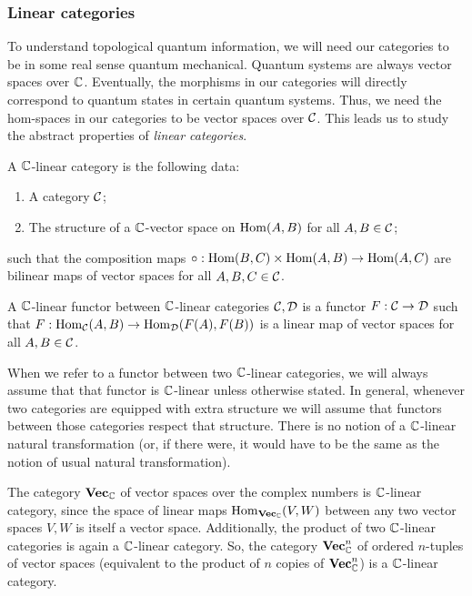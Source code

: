 \subsubsection{Linear categories}

To understand topological quantum information, we will need our categories to be in some real sense quantum mechanical. Quantum systems are always vector spaces over ${\mathbb C}$. Eventually, the morphisms in our categories will directly correspond to quantum states in certain quantum systems. Thus, we need the hom-spaces in our categories to be vector spaces over ${\mathcal C}$. This leads us to study the abstract properties of {\em linear categories}.

\begin{defn} A ${\mathbb C}$-linear category is the following data:

\begin{enumerate}
\item A category ${\mathcal C}$;
\item The structure of a ${\mathbb C}$-vector space on $\operatorname{Hom}(A,B)$ for all $A,B\in {\mathcal C}$;

\end{enumerate}

such that the composition maps $\circ:\operatorname{Hom}(B,C)\times \operatorname{Hom}(A,B)\to \operatorname{Hom}(A,C)$ are bilinear maps of vector spaces for all $A,B,C\in {\mathcal C}$.
\end{defn}

\begin{defn} A ${\mathbb C}$-linear functor between ${\mathbb C}$-linear categories ${\mathcal C},{\mathcal D}$ is a functor $F:{\mathcal C}\to{\mathcal D}$ such that $F:\operatorname{Hom}_{\mathcal C}(A,B)\to\operatorname{Hom}_{\mathcal D}(F(A),F(B))$ is a linear map of vector spaces for all $A,B\in{\mathcal C}$.
\end{defn}

\begin{rem} When we refer to a functor between two ${\mathbb C}$-linear categories, we will always assume that that functor is ${\mathbb C}$-linear unless otherwise stated. In general, whenever two categories are equipped with extra structure we will assume that functors between those categories respect that structure. There is no notion of a ${\mathbb C}$-linear natural transformation (or, if there were, it would have to be the same as the notion of usual natural transformation).
\end{rem}

\begin{ex} The category ${\bf Vec}_{{\mathbb C}}$ of vector spaces over the complex numbers is  ${\mathbb C}$-linear category, since the space of linear maps $\operatorname{Hom}_{{\bf Vec}_{{\mathbb C}}}(V,W)$ between any two vector spaces $V,W$ is itself a vector space. Additionally, the product of two ${\mathbb C}$-linear categories is again a ${\mathbb C}$-linear category. So, the category ${\bf Vec}_{{\mathbb C}}^n$ of ordered $n$-tuples of vector spaces (equivalent to the product of $n$ copies of ${\bf Vec}_{{\mathbb C}}^n$) is a ${\mathbb C}$-linear category.
\end{ex}

